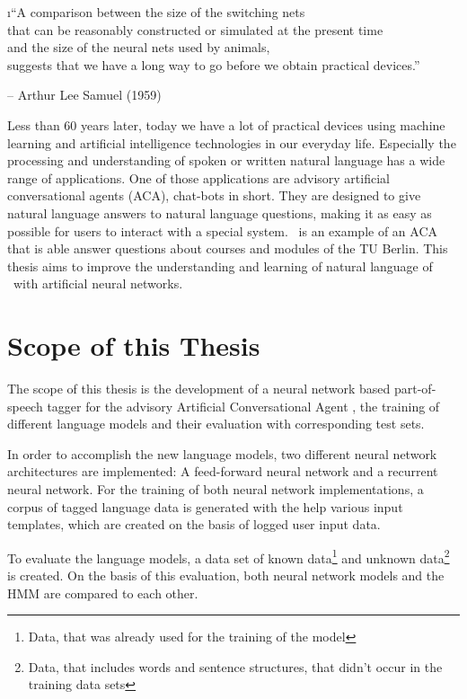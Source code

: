 \vspace{1em}
\i{``A comparison between the size of the switching nets\\that can be reasonably constructed or simulated at the present time\\and the size of the neural nets used by animals,\\suggests that we have a long way to go before we obtain practical devices.''}\\
\parbox{\textwidth}{\hfill \hfill -- Arthur Lee Samuel (1959)}
\vspace{.5em}

Less than 60 years later, today we have a lot of practical devices using machine learning and artificial intelligence technologies in our everyday life. Especially the processing and understanding of spoken or written natural language has a wide range of applications. One of those applications are advisory artificial conversational agents (ACA), chat-bots in short. They are designed to give natural language answers to natural language questions, making it as easy as possible for users to interact with a special system. \Alex\ is an example of an ACA that is able answer questions about courses and modules of the TU Berlin. This thesis aims to improve the understanding and learning of natural language of \Alex\ with artificial neural networks.

\section{Scope of this Thesis}\label{c.introduction.scope}
The scope of this thesis is the development of a neural network based part-of-speech tagger for the advisory Artificial Conversational Agent \Alex, the training of different language models and their evaluation with corresponding test sets.

In order to accomplish the new language models, two different neural network architectures are implemented: A feed-forward neural network and a recurrent neural network. For the training of both neural network implementations, a corpus of tagged language data is generated with the help various input templates, which are created on the basis of logged user input data.

To evaluate the language models, a data set of known data\footnote{Data, that was already used for the training of the model} and unknown data\footnote{Data, that includes words and sentence structures, that didn't occur in the training data sets} is created. On the basis of this evaluation, both neural network models and the HMM are compared to each other.

